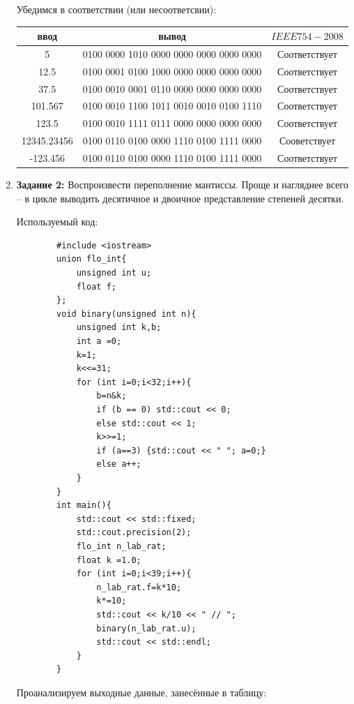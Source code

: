 \documentclass[a4paper, 12pt]{article}
\begin{document}
\begin{enumerate}
        Убедимся в соответствии (или несоответсвии):
        
        \begin{tabular}{|c|c|c|}
            \hline
            ввод & вывод & $IEEE 754-2008$ \\\hline
            5 & 0100 0000 1010 0000 0000 0000 0000 0000 & Соответствует\\\hline
            12.5 & 0100 0001 0100 1000 0000 0000 0000 0000 & Соответствует\\\hline
            37.5 & 0100 0010 0001 0110 0000 0000 0000 0000 & Соответствует\\\hline
            101.567 & 0100 0010 1100 1011 0010 0010 0100 1110 & Соответствует\\\hline
            123.5 & 0100 0010 1111 0111 0000 0000 0000 0000 & Соответствует\\\hline
            12345.23456 & 0100 0110 0100 0000 1110 0100 1111 0000 & Сооветствует\\\hline
            -123.456 & 0100 0110 0100 0000 1110 0100 1111 0000 & Соответствует\\\hline
        \end{tabular}
        \newpage
        \item \textbf{Задание 2:} Воспроизвести переполнение мантиссы. Проще и нагляднее всего – в цикле выводить десятичное и двоичное представление степеней десятки.

        Используемый код:
        \begin{lstlisting}
        #include <iostream>
        union flo_int{
            unsigned int u;
            float f;
        };
        void binary(unsigned int n){
            unsigned int k,b;
            int a =0;
            k=1;
            k<<=31;
            for (int i=0;i<32;i++){
                b=n&k;
                if (b == 0) std::cout << 0;
                else std::cout << 1;
                k>>=1;
                if (a==3) {std::cout << " "; a=0;}
                else a++;
            }
        }
        int main(){
            std::cout << std::fixed;
            std::cout.precision(2);
            flo_int n_lab_rat;
            float k =1.0;
            for (int i=0;i<39;i++){
                n_lab_rat.f=k*10;
                k*=10;
                std::cout << k/10 << " // ";
                binary(n_lab_rat.u);
                std::cout << std::endl;
            }
        }
        \end{lstlisting}
        Проанализируем выходные данные, занесённые в таблицу:
        

\end{enumerate}
\end{document}
